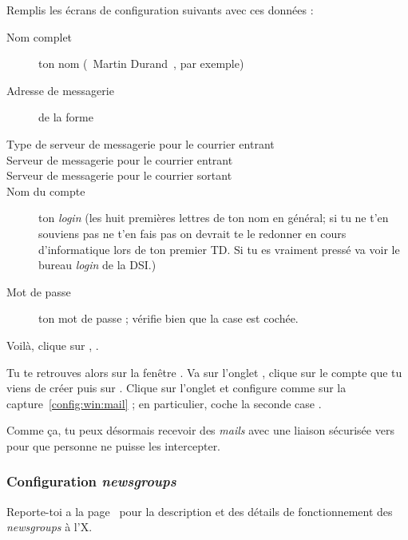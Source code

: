 Remplis les écrans de configuration suivants avec ces données :
\begin{description}
  \item[Nom complet] ton nom (\guillemotleft~Martin Durand~\guillemotright , par exemple)
  \item[Adresse de messagerie] de la forme 
  \item[Type de serveur de messagerie pour le courrier entrant] 
  \item[Serveur de messagerie pour le courrier entrant] 
  \item[Serveur de messagerie pour le courrier sortant] 
  \item[Nom du compte] ton \emph{login}  (les huit premières lettres de ton nom en général; si tu ne t'en souviens pas ne t'en fais pas on devrait te le redonner en cours d'informatique lors de ton premier TD. Si tu es vraiment pressé va voir le bureau \emph{login} de la DSI.)
  \item[Mot de passe] ton mot de passe  ;
       vérifie bien que la case  est cochée.
\end{description}

Voilà, clique sur , .

Tu te retrouves alors sur la fenêtre . Va sur
l'onglet , clique sur le compte que tu viens de créer
puis sur . Clique sur l'onglet  et
configure comme sur la capture~\ref{config:win:mail} ; en
particulier, coche la seconde case .

Comme \c{c}a, tu peux désormais recevoir des \emph{mails} avec une liaison
sécurisée vers  pour que personne ne puisse les
intercepter.



\subsubsection{Configuration \emph{newsgroups}}

Reporte-toi a la page~\pageref{newsgroups} pour la description et des détails de fonctionnement des \emph{newsgroups} à l'X.

